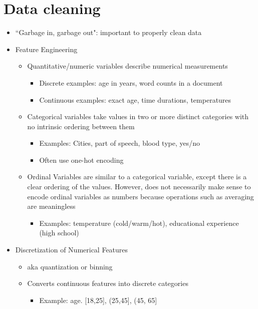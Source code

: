 \documentclass[10pt, oneside]{article}
\begin{document}
\section{Data cleaning}
\begin{itemize}
    \item ``Garbage in, garbage out": important to properly clean data
    \item Feature Engineering
    \begin{itemize}
        \item Quantitative/numeric variables describe numerical measurements
        \begin{itemize}
            \item Discrete examples: age in years, word counts in a document
            \item Continuous examples: exact age, time durations, temperatures
        \end{itemize}
        \item Categorical variables take values in two or more distinct categories with no intrinsic ordering between them
        \begin{itemize}
            \item Examples: Cities, part of speech, blood type, yes/no
            \item Often use one-hot encoding
        \end{itemize}
        \item Ordinal Variables are similar to a categorical variable, except there is a clear ordering of the values. However, does not necessarily make sense to encode ordinal variables as numbers because operations such as averaging are meaningless
        \begin{itemize}
            \item Examples: temperature (cold/warm/hot), educational experience (high school)
        \end{itemize}
    \end{itemize}
    \item Discretization of Numerical Features
    \begin{itemize}
        \item aka quantization or binning
        \item Converts continuous features into discrete categories
        \begin{itemize}
            \item Example: age. [18,25], (25,45], (45, 65]
        \end{itemize}

\end{itemize}
\end{itemize}
\end{document}
